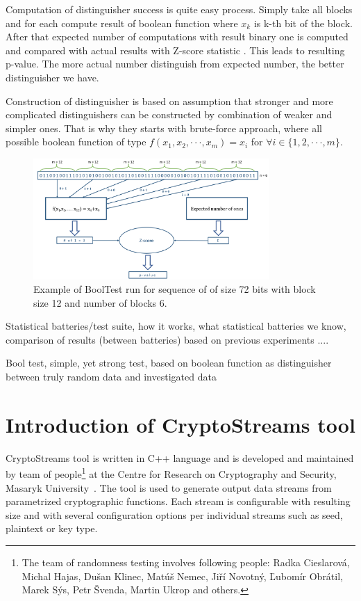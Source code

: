 \documentclass[
    digital,    %
    oneside,    %
    color,
    11pt,
    nocover,
    notable,
    nolof,
    nolot,
    final
]{fithesis3}
\begin{document}
Computation of distinguisher success is quite easy process. Simply take all blocks and for each compute result of boolean function where $x_{k}$ is k-th bit of the block.
After that expected number of computations with result binary one is computed and compared with actual results with Z-score statistic \cite{sheskin2003handbook}. This leads to resulting p-value. The more actual number distinguish from expected number, the better distinguisher we have.

Construction of distinguisher is based on assumption that stronger and more complicated distinguishers can be constructed by combination of weaker and simpler ones. That is why they starts with brute-force approach, where all possible boolean function of type  $f(x_{1}, x_{2}, \cdot \cdot \cdot, x_{m}) = x_{i}$ for $\forall i \in \{1, 2, \cdot \cdot \cdot, m\}$. \cite{booltest-secrypt2017}

\begin{figure}[h]
	\centering
	\includegraphics[width=0.8\textwidth]{./images/pictures/bool-test.png}
	\caption{Example of BoolTest run for sequence of of size 72 bits with block size 12 and number of blocks 6.}
	\label{fig:whole-suite}
\end{figure}


 
Statistical batteries/test suite, how it works, what statistical batteries we know, comparison of results (between batteries) based on previous experiments ....

Bool test, simple, yet strong test, based on boolean function as distinguisher between truly random data and investigated data 

\chapter{Introduction of CryptoStreams tool}
\label{chap:cryptostreams}

CryptoStreams tool is written in C++ language and is developed and maintained by team of people\footnote{The team of randomness testing involves following people: Radka Cieslarová, Michal Hajas, Dušan Klinec, Matúš Nemec, Jiří Novotný, Ľubomír Obrátil, Marek Sýs, Petr Švenda, Martin Ukrop and others.} at the Centre for Research on Cryptography and Security, Masaryk University~\cite{CryptoStreams}. The tool is used to generate output data streams from parametrized cryptographic functions. Each stream is configurable with resulting size and with several configuration options per individual streams such as seed, plaintext or key type. 
\end{document}
